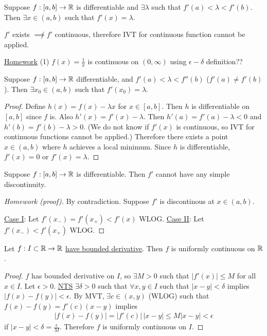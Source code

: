 \documentclass[]{article}
\begin{document}
\begin{theorem}
	\label{thm-5-12}
	Suppose $f:[a,b]\rightarrow\mathbb{R}$ is differentiable and $\exists\lambda$ such that $f'(a)<\lambda<f'(b)$.
	Then $\exists x\in(a,b)$ such that $f'(x)=\lambda$.
\end{theorem}
\begin{note}
	$f'$ exists $\not\implies f'$ continuous, therefore IVT for continuous function cannot be applied.
\end{note}

\ul{Homework} (1) $f(x) = \frac1x$ is continuous on $(0,\infty)$ using $\epsilon-\delta$ definition??

\begin{recall}
	Suppose $f:[a,b]\rightarrow\mathbb{R}$ differentiable, and $f'(a)<\lambda<f''(b)$ ($f'(a)\neq f'(b)$). Then $\exists x_0\in(a,b)$ such that $f'(x_0) = \lambda$.
\end{recall}
\begin{proof}
	Define $h(x) = f(x)-\lambda x$ for $x\in[a,b]$.
	Then $h$ is differentiable on $[a,b]$ since $f$ is. Also $h'(x) = f'(x)-\lambda$.
	Then $h'(a) = f'(a)-\lambda<0$ and $h'(b)=f'(b) - \lambda >0$.
	(We do not know if $f'(x)$ is continuous, so IVT for continuous functions cannot be applied.)
	Therefore there exists a point $x\in(a,b)$ where $h$ achieves a local minimum.
	Since $h$ is differentiable, $f'(x)=0$ or $f'(x) = \lambda$.
\end{proof}
\begin{corollary}
	Suppose $f:[a,b]\rightarrow\mathbb{R}$ is differentiable. Then $f'$ cannot have any simple discontinuity.
\end{corollary}
\begin{proof}
	[Homework (proof)]
	By contradiction. Suppose $f'$ is discontinous at $x\in(a,b)$.

	\ul{Case I}: Let $f'(x_-) = f'(x_+) < f'(x)$ WLOG.
	\ul{Case II}: Let $f'(x_-)<f'(x_+)$ WLOG.
\end{proof}
\begin{corollary}
	Let $f:I\subset\mathbb{R}\rightarrow\mathbb{R}$ \ul{have bounded derivative}. Then $f$ is uniformly continuous on $\mathbb{R}$.
\end{corollary}
\begin{proof}
	$f$ has bounded derivative on $I$, so  $\exists M>0$ such that $|f'(x)|\leq M$ for all $x\in I$.
	Let $\epsilon>0$. \ul{\ul{NTS}} $\exists\delta>0$ such that $\forall x,y\in I$ such that $|x-y|<\delta$ implies $|f(x)-f(y)|<\epsilon$.
	By MVT, $\exists c\in(x,y)$ (WLOG) such that $f(x)-f(y) = f'(c)(x-y)$ implies
	\begin{align*}
		|f(x)-f(y)| = |f'(c)|\,|x-y|
					\leq M|x-y|
					< \epsilon
	\end{align*}
	if $|x-y|<\delta=\frac\epsilon M$.
	Therefore $f$ is uniformly continuous on $I$.
\end{proof}
\end{document}
